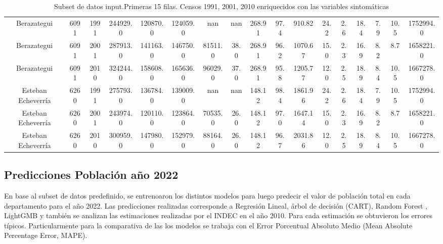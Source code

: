 \documentclass{article}
\theoremstyle{mytheoremstyle}
\theoremstyle{mytheoremstyle}
\theoremstyle{myproblemstyle}
\begin{document}
{\begin{landscape}
\begin{table}[htb]
\begin{tabular}{|c|c|c|c|c|c|c|c|c|c|c|c|c|c|c|c|c|}
        Berazategui & 6091 & 1991 & 244929.0 & 120870.0 & 124059.0 & nan & nan & 268.91 & 97.4 & 910.82 & 24.2 & 2.6 & 18.4 & 7.9 & 10.5 & 1752994.0 \\
        Berazategui & 6091 & 2001 & 287913.0 & 141163.0 & 146750.0 & 81511.0 & 38.0 & 268.91 & 96.2 & 1070.67 & 15.0 & 2.3 & 16.9 & 8.2 & 8.7 & 1658221.0 \\
        Berazategui & 6091 & 2010 & 324244.0 & 158608.0 & 165636.0 & 96029.0 & 37.0 & 268.91 & 95.8 & 1205.77 & 12.0 & 2.5 & 18.9 & 8.4 & 10.5 & 1667278.0 \\
        Esteban Echeverría & 6260 & 1991 & 275793.0 & 136784.0 & 139009.0 & nan & nan & 148.12 & 98.4 & 1861.96 & 24.2 & 2.6 & 18.4 & 7.9 & 10.5 & 1752994.0 \\
        Esteban Echeverría & 6260 & 2001 & 243974.0 & 120110.0 & 123864.0 & 70535.0 & 26.0 & 148.12 & 97.0 & 1647.14 & 15.0 & 2.3 & 16.9 & 8.2 & 8.7 & 1658221.0 \\
        Esteban Echeverría & 6260 & 2010 & 300959.0 & 147980.0 & 152979.0 & 88164.0 & 26.0 & 148.12 & 96.7 & 2031.86 & 12.0 & 2.5 & 18.9 & 8.4 & 10.5 & 1667278.0 \\
        \hline
      \end{tabular}
      \caption{Subset de datos input.Primeras 15 filas. Censos 1991, 2001, 2010 enriquecidos con las variables sintomáticas}
    \label{tab:baseModelos}
    \end{table}
    \end{landscape}
    
 }

 \subsection{Predicciones Población año 2022}
  
 En base al subset de datos predefinido, se entrenoaron los distintos modelos para luego predecir el valor de población total en cada
 departamento para el año 2022. Las predicciones realizadas corresponde a  Regresión Lineal, árbol de decisión (CART), Random Forest , LightGMB
 y también se analizan las estimaciones realizadas por el INDEC en el año 2010. Para cada estimación se obtuvieron los errores 
 típicos. Particularmente para la comparativa de las los modelos se trabaja con el 
 Error Porcentual Absoluto Medio (Mean Absolute Percentage Error, MAPE).\newline
\end{document}
